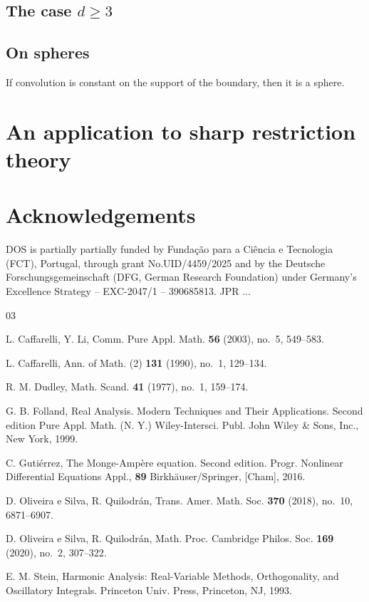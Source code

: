 \documentclass[11pt]{amsart}
\begin{document}
\subsection{The case $d\geq 3$}
\subsection{On spheres}
 If convolution is constant on the support of the boundary, then it is a sphere.
\section{An application to sharp restriction theory  }


\section*{Acknowledgements}
DOS  is partially partially funded by Fundação para a Ciência e Tecnologia (FCT), Portugal, through  grant No.\@ UID/4459/2025 and  by the Deutsche Forschungsgemeinschaft 
 (DFG, German Research Foundation) under Germany's Excellence Strategy – EXC-2047/1 – 390685813.
JPR ...

\begin{thebibliography}{03}

 L. Caffarelli, Y. Li,
\newblock Comm. Pure Appl. Math. {\bf 56} (2003), no.~5, 549--583.

 L. Caffarelli,
\newblock Ann. of Math. (2) {\bf 131} (1990), no.~1, 129--134.

 R. M. Dudley, 
\newblock Math. Scand. {\bf 41} (1977), no.~1, 159--174.

 G. B. Folland, 
\newblock Real Analysis.
Modern Techniques and Their Applications. Second edition
\newblock Pure Appl. Math. (N. Y.)
Wiley-Intersci. Publ.
John Wiley \& Sons, Inc., New York, 1999.


 C. Gutiérrez,
\newblock The Monge-Ampère equation.
Second edition. 
\newblock Progr. Nonlinear Differential Equations Appl., {\bf 89}
Birkhäuser/Springer, [Cham], 2016. 

 D. Oliveira e Silva, R. Quilodrán, 
\newblock Trans. Amer. Math. Soc. {\bf 370} (2018), no.~10, 6871--6907.

 D. Oliveira e Silva, R. Quilodrán, 
\newblock Math. Proc. Cambridge Philos. Soc.   {\bf 169} (2020), no.~2, 307--322.




 E. M. Stein,
\newblock Harmonic Analysis: Real-Variable Methods, Orthogonality, and Oscillatory Integrals.
\newblock Princeton Univ. Press, Princeton, NJ, 1993.
\end{thebibliography}
\end{document}
